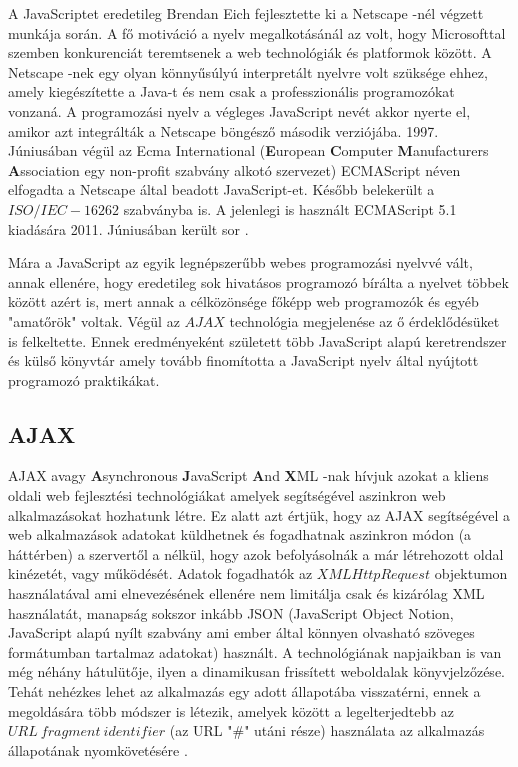 \documentclass[12pt]{report}
\theoremstyle{definition}
\begin{document}
	A JavaScriptet eredetileg Brendan Eich fejlesztette ki a Netscape -nél végzett munkája során. A fő motiváció a nyelv megalkotásánál az volt, hogy Microsofttal szemben konkurenciát teremtsenek a web technológiák és platformok között. A Netscape -nek egy olyan könnyűsúlyú interpretált nyelvre volt szüksége ehhez, amely kiegészítette a Java-t és nem csak a professzionális programozókat vonzaná. A programozási nyelv a végleges JavaScript nevét akkor nyerte el, amikor azt integrálták a Netscape böngésző második verziójába. 1997. Júniusában végül az Ecma International (\textbf{E}uropean \textbf{C}omputer \textbf{M}anufacturers \textbf{A}ssociation egy non-profit szabvány alkotó szervezet) ECMAScript néven elfogadta a Netscape által beadott JavaScript-et. Később belekerült a $ISO/IEC-16262$ szabványba is. A jelenlegi is használt ECMAScript 5.1 kiadására 2011. Júniusában került sor \cite{ECMAScript 5.1 release}.
	
	Mára a JavaScript az egyik legnépszerűbb webes programozási nyelvvé vált, annak ellenére, hogy eredetileg sok hivatásos programozó bírálta a nyelvet többek között azért is, mert annak a célközönsége főképp web programozók és egyéb "amatőrök" voltak. Végül az $AJAX$ technológia megjelenése az ő érdeklődésüket is felkeltette. Ennek eredményeként született több JavaScript alapú keretrendszer és külső könyvtár amely tovább finomította a JavaScript nyelv által nyújtott programozó praktikákat. 
	
	\subsection{AJAX}
	
	AJAX avagy \textbf{A}synchronous \textbf{J}avaScript \textbf{A}nd \textbf{X}ML -nak hívjuk azokat a kliens oldali web fejlesztési technológiákat amelyek segítségével aszinkron web alkalmazásokat hozhatunk létre. Ez alatt azt értjük, hogy az AJAX segítségével a web alkalmazások adatokat küldhetnek és fogadhatnak aszinkron módon (a háttérben) a szervertől a nélkül, hogy azok befolyásolnák a már létrehozott oldal kinézetét, vagy működését. Adatok fogadhatók az $XMLHttpRequest$ objektumon használatával ami elnevezésének ellenére nem limitálja csak és kizárólag XML használatát, manapság sokszor inkább JSON (JavaScript Object Notion, JavaScript alapú nyílt szabvány ami ember által könnyen olvasható szöveges formátumban tartalmaz adatokat) használt. A technológiának napjaikban is van még néhány hátulütője, ilyen a dinamikusan frissített weboldalak könyvjelzőzése. Tehát nehézkes lehet az alkalmazás egy adott állapotába visszatérni, ennek a megoldására több módszer is létezik, amelyek között a legelterjedtebb az $URL\ fragment\ identifier$ (az URL "\#" utáni része) használata az alkalmazás állapotának nyomkövetésére \cite{deep linking for ajax}. 
	
\end{document}

